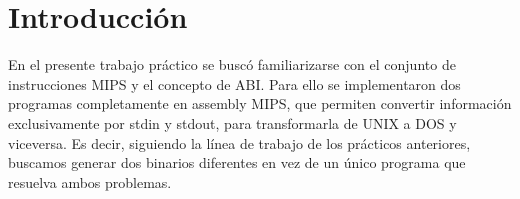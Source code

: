 \documentclass[a4paper,10pt]{article}
\begin{document}

\setcounter{page}{2}

\newpage
\thispagestyle{empty}
\tableofcontents

\newpage
\section{Introducci\'on}
   En el presente trabajo pr\'actico se busc\'o  familiarizarse con el conjunto de instrucciones MIPS y el concepto de ABI. Para ello se implementaron dos programas completamente en assembly MIPS, que permiten convertir informaci\'on exclusivamente por stdin y stdout, para transformarla de UNIX a DOS y viceversa. Es decir, siguiendo la l\'inea de trabajo de los pr\'acticos anteriores, buscamos generar dos binarios diferentes en vez de un \'unico programa que resuelva ambos problemas.
\end{document}
